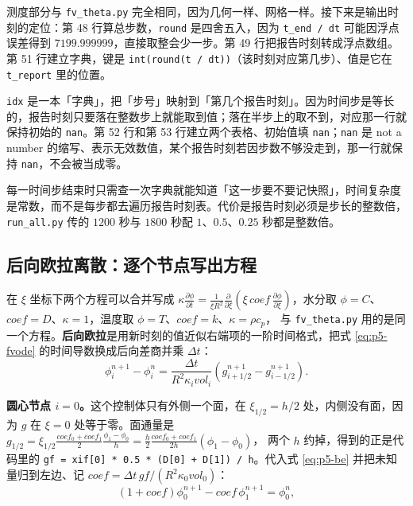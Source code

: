 测度部分与 \texttt{fv\_theta.py} 完全相同，因为几何一样、网格一样。接下来是输出时刻的定位：第 48 行算总步数，\texttt{round} 是四舍五入，因为 \texttt{t\_end / dt} 可能因浮点误差得到 $7199.999999$，直接取整会少一步。第 49 行把报告时刻转成浮点数组。第 51 行建立字典，键是 \texttt{int(round(t / dt))}（该时刻对应第几步）、值是它在 \texttt{t\_report} 里的位置。

\texttt{idx} 是一本「字典」，把「步号」映射到「第几个报告时刻」。因为时间步是等长的，报告时刻只要落在整数步上就能取到值；落在半步上的取不到，对应那一行就保持初始的 \texttt{nan}。第 52 行和第 53 行建立两个表格、初始值填 \texttt{nan}；\texttt{nan} 是 not a number 的缩写、表示无效数值，某个报告时刻若因步数不够没走到，那一行就保持 \texttt{nan}，不会被当成零。

每一时间步结束时只需查一次字典就能知道「这一步要不要记快照」，时间复杂度是常数，而不是每步都去遍历报告时刻表。代价是报告时刻必须是步长的整数倍，\texttt{run\_all.py} 传的 $1200$ 秒与 $1800$ 秒配 $1$、$0.5$、$0.25$ 秒都是整数倍。

\subsection{后向欧拉离散：逐个节点写出方程}

在 $\xi$ 坐标下两个方程可以合并写成 $\kappa\frac{\partial\phi}{\partial t}=\frac{1}{\xi R^2}\frac{\partial}{\partial\xi}\left(\xi\,coef\,\frac{\partial\phi}{\partial\xi}\right)$，水分取 $\phi=C$、$coef=D$、$\kappa=1$，温度取 $\phi=T$、$coef=k$、$\kappa=\rho c_p$，
与 \texttt{fv\_theta.py} 用的是同一个方程。\textbf{后向欧拉}是用新时刻的值近似右端项的一阶时间格式，把式 \eqref{eq:p5-fvode} 的时间导数换成后向差商并乘 $\Delta t$：
\begin{equation}
\phi_i^{n+1}-\phi_i^{n}
=\frac{\Delta t}{R^2\kappa_ivol_i}\left(g_{i+1/2}^{n+1}-g_{i-1/2}^{n+1}\right).
\label{eq:p5-be}
\end{equation}

\textbf{圆心节点 $i=0$。}这个控制体只有外侧一个面，在 $\xi_{1/2}=h/2$ 处，内侧没有面，因为 $g$ 在 $\xi=0$ 处等于零。面通量是 $g_{1/2}=\xi_{1/2}\frac{coef_0+coef_1}{2}\frac{\phi_1-\phi_0}{h}=\frac h2\frac{coef_0+coef_1}{2h}\left(\phi_1-\phi_0\right)$，
两个 $h$ 约掉，得到的正是代码里的 \texttt{gf = xif[0] * 0.5 * (D[0] + D[1]) / h}。代入式 \eqref{eq:p5-be} 并把未知量归到左边、记 $coef=\Delta t\,gf/(R^2\kappa_0vol_0)$：
\begin{equation}
\left(1+coef\right)\phi_0^{n+1}-coef\,\phi_1^{n+1}=\phi_0^{n},
\end{equation}

